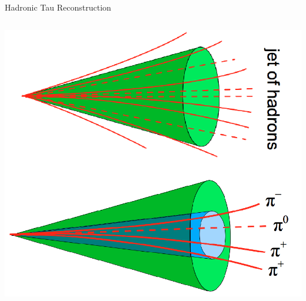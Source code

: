 \begin{frame}{Hadronic Tau Reconstruction}
\begin{columns}[c]
        \includegraphics[width=\textwidth]{slides/figures/tausignature_trans.png}
    \end{columns}
    
\end{frame}